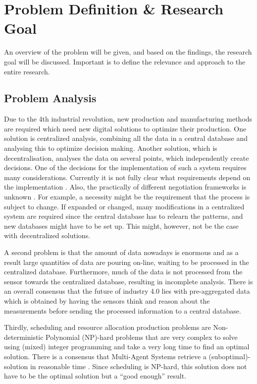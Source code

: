 \chapter{Problem Definition \& Research Goal}
\label{chp:problem}
An overview of the problem will be given, and based on the findings, the research goal will be discussed. Important is to define the relevance and approach to the entire research. 
\section{Problem Analysis}
Due to the 4th industrial revolution, new production and manufacturing methods are required which need new digital solutions to optimize their production. One solution is centralized analysis, combining all the data in a central database and analysing this to optimize decision making. Another solution, which is decentralisation, analyses the data on several points, which independently create decisions. One of the decisions for the implementation of such a system requires many considerations. Currently it is not fully clear what requirements depend on the implementation \citep{leitao2016smart}. Also, the practically of different negotiation frameworks is unknown \citep{fatima2014principles}. For example, a necessity might be the requirement that the process is subject to change. If expanded or changed, many modifications in a centralized system are required since the central database has to relearn the patterns, and new databases might have to be set up. This might, however, not be the case with decentralized solutions. %

A second problem is that the amount of data nowadays is enormous and as a result large quantities of data are pouring on-line, waiting to be processed in the centralized database. Furthermore, much of the data is not processed from the sensor towards the centralized database, resulting in incomplete analysis. There is an overall consensus that the future of industry 4.0 lies with pre-aggregated data \citep{deloitte2015connected} which is obtained by having the sensors think and reason about the measurements before sending the processed information to a central database.

Thirdly, scheduling and resource allocation production problems are Non-deterministic Polynomial (NP)-hard problems that are very complex to solve using (mixed) integer programming and take a very long time to find an optimal solution. There is a consensus that Multi-Agent Systems retrieve a (suboptimal)-solution in reasonable time \citep{konolige1980multiple}. Since scheduling is NP-hard, this solution does not have to be the optimal solution but a ``good enough'' result.  

